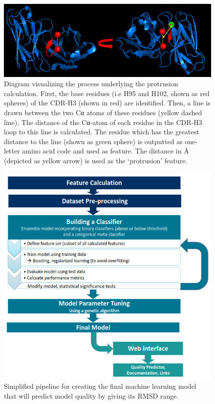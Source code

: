 \documentclass[preprint,12pt]{elsarticle}
\begin{document}
\begin{figure}[h!]
  \includegraphics[scale=0.6]{angle.png}
  \caption {Diagram visualizing the process underlying the protrusion calculation. First, the base residues (i.e H95 and H102, shown as red spheres) of the CDR-H3 (shown in red) are identified. Then, a line is drawn between the two Cα atoms of these residues (yellow dashed line). The distance of the Cα-atom of each residue in the CDR-H3 loop to this line is calculated. The residue which has the greatest distance to the line (shown as green sphere) is outputted as one-letter amino acid code and used as feature. The distance in Å (depicted as yellow arrow) is used as the ‘protrusion’ feature. }
  \label{fig:angle}
\end{figure}


\begin{figure}[h!]
  \includegraphics[scale=0.45]{method.png}
  \caption {Simplified pipeline for creating the final machine learning model that will predict model quality by giving its RMSD range.}
  \label{fig:method}
\end{figure}







 
\end{document}
